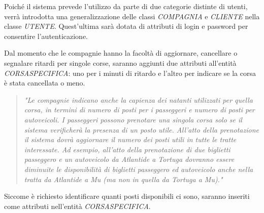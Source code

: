 Poiché il sistema prevede l'utilizzo da parte di due categorie distinte di utenti, verrà introdotta una generalizzazione delle classi \textit{COMPAGNIA} e \textit{CLIENTE} nella classe \textit{UTENTE}. Quest'ultima sarà dotata di attributi di login e password per consentire l'autenticazione.

Dal momento che le compagnie hanno la facoltà di aggiornare, cancellare o segnalare ritardi per singole corse, saranno aggiunti due attributi all'entità \textit{CORSASPECIFICA}: uno per i minuti di ritardo e l'altro per indicare se la corsa è stata cancellata o meno.

\begin{quote}
    \textit{"Le compagnie indicano anche la capienza dei natanti utilizzati per quella corsa, in termini di numero di posti per i passeggeri e numero di posti per autoveicoli. I passeggeri possono prenotare una singola corsa solo se il sistema verificherà la presenza di un posto utile. All’atto della prenotazione il sistema dovrà aggiornare il numero dei posti utili in tutte le tratte interessate. Ad esempio, all’atto della prenotazione di due biglietti passeggero e un autoveicolo da Atlantide a Tortuga dovranno essere diminuite le disponibilità di biglietti passeggero ed autoveicolo anche nella tratta da Atlantide a Mu (ma non in quella da Tortuga a Mu)."}
\end{quote}

Siccome è richiesto identificare quanti posti disponibili ci sono, saranno inseriti come attributi nell'entità \textit{CORSASPECIFICA}.